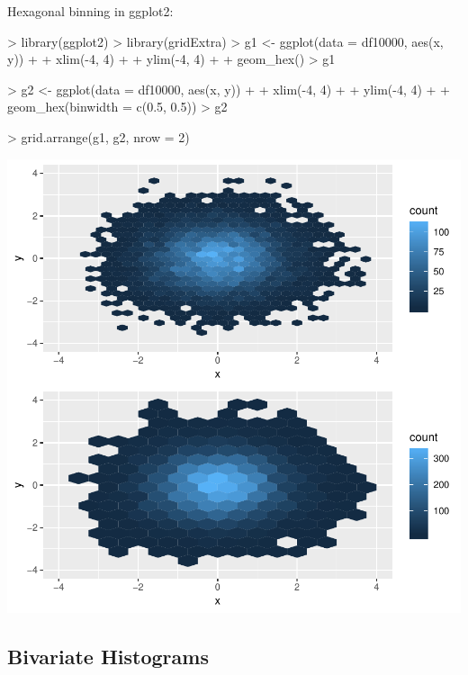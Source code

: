 \documentclass[12pt,letterpaper,final]{article}
\begin{document}
Hexagonal binning in ggplot2:

\begin{Schunk}
\begin{Sinput}
> library(ggplot2)
> library(gridExtra)
> g1 <- ggplot(data = df10000, aes(x, y)) + 
+   xlim(-4, 4) +
+   ylim(-4, 4) +
+   geom_hex() 
> g1
\end{Sinput}
\end{Schunk}


\begin{Schunk}
\begin{Sinput}
> g2 <- ggplot(data = df10000, aes(x, y)) + 
+   xlim(-4, 4) +
+   ylim(-4, 4) +
+   geom_hex(binwidth = c(0.5, 0.5)) 
> g2
\end{Sinput}
\end{Schunk}


\begin{Schunk}
\begin{Sinput}
> grid.arrange(g1, g2, nrow = 2)
\end{Sinput}
\end{Schunk}
\includegraphics{lect_main-017}


\newpage


\subsection{Bivariate Histograms}
\end{document}
